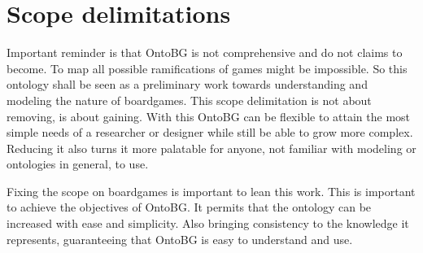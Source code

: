 \section{Scope delimitations} 

Important reminder is that OntoBG is not comprehensive and do not claims to become. To map all possible ramifications of games might be impossible. So this ontology shall be seen as a preliminary work towards understanding and modeling the nature of boardgames. This scope delimitation is not about removing, is about gaining. With this OntoBG can be flexible to attain the most simple needs of a researcher or designer while still be able to grow more complex. Reducing it also turns it more palatable for anyone, not familiar with modeling or ontologies in general, to use.

Fixing the scope on boardgames is important to lean this work. This is important to achieve the objectives of OntoBG. It permits that the ontology can be increased with ease and simplicity. Also bringing consistency to the knowledge it represents, guaranteeing that OntoBG is easy to understand and use.